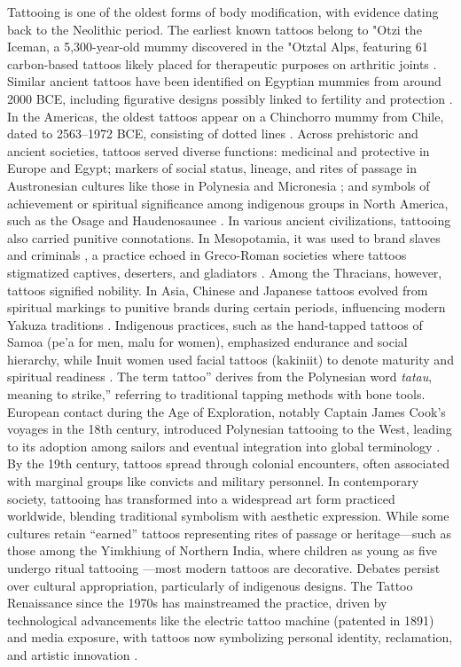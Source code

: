 \documentclass[11pt]{article}
\begin{document}
Tattooing is one of the oldest forms of body modification, with evidence dating back to the Neolithic period. The earliest known tattoos belong to "Otzi the Iceman, a 5,300-year-old mummy discovered in the "Otztal Alps, featuring 61 carbon-based tattoos likely placed for therapeutic purposes on arthritic joints \cite{Samadelli2015,deterwolf_worlds_oldest}. Similar ancient tattoos have been identified on Egyptian mummies from around 2000 BCE, including figurative designs possibly linked to fertility and protection \cite{friedman2018natural}. In the Americas, the oldest tattoos appear on a Chinchorro mummy from Chile, dated to 2563--1972 BCE, consisting of dotted lines \cite{arrietamummies}. Across prehistoric and ancient societies, tattoos served diverse functions: medicinal and protective in Europe and Egypt; markers of social status, lineage, and rites of passage in Austronesian cultures like those in Polynesia and Micronesia \cite{kluger2015cultural}; and symbols of achievement or spiritual significance among indigenous groups in North America, such as the Osage and Haudenosaunee \cite{deterwolf2013drawing}.
In various ancient civilizations, tattooing also carried punitive connotations. In Mesopotamia, it was used to brand slaves and criminals \cite{hawken2022tattooing}, a practice echoed in Greco-Roman societies where tattoos stigmatized captives, deserters, and gladiators \cite{jones1987stigma}. Among the Thracians, however, tattoos signified nobility. In Asia, Chinese and Japanese tattoos evolved from spiritual markings to punitive brands during certain periods, influencing modern Yakuza traditions \cite{krutak2012tattooing}. Indigenous practices, such as the hand-tapped tattoos of Samoa (pe'a for men, malu for women), emphasized endurance and social hierarchy, while Inuit women used facial tattoos (kakiniit) to denote maturity and spiritual readiness \cite{johnston2017reawakening}.
The term tattoo'' derives from the Polynesian word \textit{tatau}, meaning to strike,'' referring to traditional tapping methods with bone tools. European contact during the Age of Exploration, notably Captain James Cook's voyages in the 18th century, introduced Polynesian tattooing to the West, leading to its adoption among sailors and eventual integration into global terminology \cite{friedman2014cook}. By the 19th century, tattoos spread through colonial encounters, often associated with marginal groups like convicts and military personnel.
In contemporary society, tattooing has transformed into a widespread art form practiced worldwide, blending traditional symbolism with aesthetic expression. While some cultures retain ``earned'' tattoos representing rites of passage or heritage---such as those among the Yimkhiung of Northern India, where children as young as five undergo ritual tattooing \cite{kluger2015cultural}---most modern tattoos are decorative. Debates persist over cultural appropriation, particularly of indigenous designs. The Tattoo Renaissance since the 1970s has mainstreamed the practice, driven by technological advancements like the electric tattoo machine (patented in 1891) and media exposure, with tattoos now symbolizing personal identity, reclamation, and artistic innovation \cite{schildkrout2004inscribing,roberts2012secret}.
\end{document}
